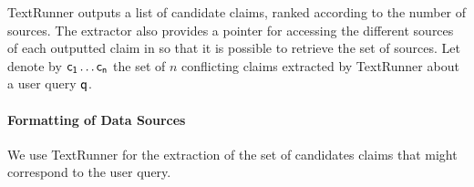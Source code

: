 TextRunner outputs a list of candidate claims, ranked according to the number of sources. The extractor also provides a pointer
for accessing the different sources of each outputted claim in so that it is possible to retrieve the set of sources. Let denote
by $\mathsf{c_{1}}\ldots \mathsf{c_{n}}$ the set of $n$ conflicting claims extracted by TextRunner about a user query $\mathsf{q}$.

\paragraph*{Formatting of Data Sources}
We use TextRunner for the extraction of the set of 
candidates claims that might correspond to the user query.
